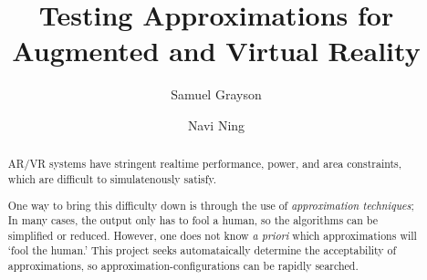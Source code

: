 \documentclass[sigconf,screen]{acmart}
\begin{document}
\title{Testing Approximations for Augmented and Virtual Reality}

\author{Samuel Grayson}

\author{Navi Ning}

\renewcommand\footnotetextcopyrightpermission[1]{} %

\newcommand{\todo}[1]{\textcolor{red}{#1}}

\begin{abstract}
AR/VR systems have stringent realtime performance, power, and area constraints, which are difficult to simulatenously satisfy.

One way to bring this difficulty down is through the use of \textit{approximation techniques}; In many cases, the output only has to fool a human, so the algorithms can be simplified or reduced. However, one does not know \textit{a priori} which approximations will `fool the human.' This project seeks automataically determine the acceptability of approximations, so approximation-configurations can be rapidly searched.
\end{abstract}




\maketitle





\end{document}
